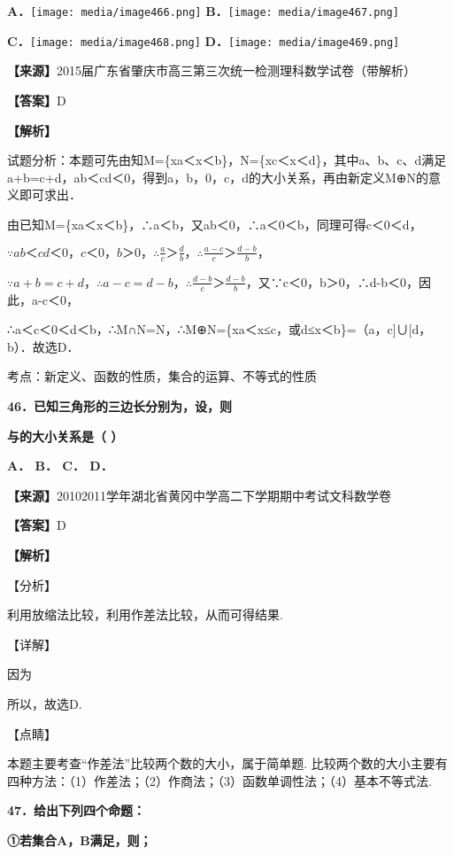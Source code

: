 \textbf{A．}\texttt{[image: media/image466.png]}
\textbf{B．}\texttt{[image: media/image467.png]}

\textbf{C．}\texttt{[image: media/image468.png]}
\textbf{D．}\texttt{[image: media/image469.png]}

\textbf{【来源】}2015届广东省肇庆市高三第三次统一检测理科数学试卷（带解析）

\textbf{【答案】}D

\textbf{【解析】}

试题分析：本题可先由知M=\{x\textbar a＜x＜b\}，N=\{x\textbar c＜x＜d\}，其中a、b、c、d满足a+b=c+d，ab＜cd＜0，得到a，b，0，c，d的大小关系，再由新定义M⊕N的意义即可求出．

由已知M=\{x\textbar a＜x＜b\}，∴a＜b，又ab＜0，∴a＜0＜b，同理可得c＜0＜d，

\(\because ab＜cd＜0，c＜0，b＞0，\therefore\frac{a}{c}＞\frac{d}{b}，\therefore\frac{a - c}{c}＞\frac{d - b}{b}，\)

\(\because a + b = c + d，\therefore a - c = d - b，\therefore\frac{d - b}{c}＞\frac{d - b}{b}，\)又∵c＜0，b＞0，∴d-b＜0，因此，a-c＜0，

∴a＜c＜0＜d＜b，∴M∩N=N，∴M⊕N=\{x\textbar a＜x≤c，或d≤x＜b\}=（a，c{]}∪{[}d，b）．故选D．

考点：新定义、函数的性质，集合的运算、不等式的性质

\textbf{46．已知三角形的三边长分别为，设，则}

\textbf{与的大小关系是（ ）}

\textbf{A． B． C． D．}

\textbf{【来源】}20102011学年湖北省黄冈中学高二下学期期中考试文科数学卷

\textbf{【答案】}D

\textbf{【解析】}

【分析】

利用放缩法比较，利用作差法比较，从而可得结果.

【详解】

因为

所以，故选D.

【点睛】

本题主要考查``作差法''比较两个数的大小，属于简单题.
比较两个数的大小主要有四种方法：（1）作差法；（2）作商法；（3）函数单调性法；（4）基本不等式法.

\textbf{47．给出下列四个命题：}

\textbf{①若集合A，B满足，则；}

